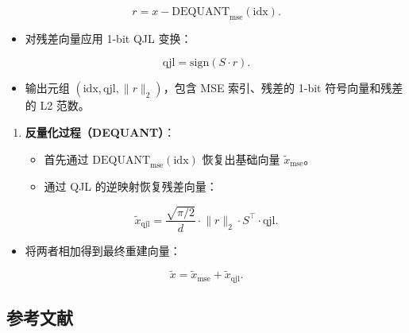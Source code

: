 \[
r = x - \mathrm{DEQUANT}_{\mathrm{mse}}(\mathrm{idx}).
\]

\begin{itemize}
\tightlist
\item
  对残差向量应用 1-bit QJL 变换：
\end{itemize}

\[
\mathrm{qjl} = \mathrm{sign}(S \cdot r).
\]

\begin{itemize}
\tightlist
\item
  输出元组 \((\mathrm{idx}, \mathrm{qjl}, \lVert r \rVert_2)\)，包含 MSE 索引、残差的 1-bit 符号向量和残差的 L2 范数。
\end{itemize}

\begin{enumerate}
\def\labelenumi{\arabic{enumi}.}
\setcounter{enumi}{2}
\tightlist
\item
  \textbf{反量化过程（DEQUANT）}：

  \begin{itemize}
  \tightlist
  \item
    首先通过 \(\mathrm{DEQUANT}_{\mathrm{mse}}(\mathrm{idx})\) 恢复出基础向量 \(\tilde{x}_{\mathrm{mse}}\)。
  \item
    通过 QJL 的逆映射恢复残差向量：
  \end{itemize}
\end{enumerate}

\[
\tilde{x}_{\mathrm{qjl}} = \frac{\sqrt{\pi/2}}{d} \cdot \lVert r \rVert_2 \cdot S^\top \cdot \mathrm{qjl}.
\]

\begin{itemize}
\tightlist
\item
  将两者相加得到最终重建向量：
\end{itemize}

\[
\tilde{x} = \tilde{x}_{\mathrm{mse}} + \tilde{x}_{\mathrm{qjl}}.
\]

\hypertarget{ux53c2ux8003ux6587ux732e-89}{%
\subsection{参考文献}\label{ux53c2ux8003ux6587ux732e-89}}

